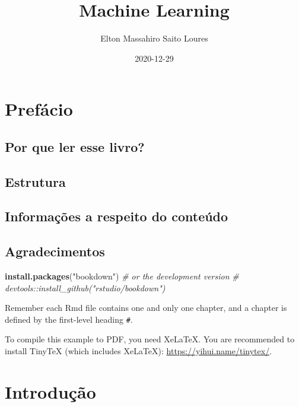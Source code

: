 \documentclass[
]{book}
\title{Machine Learning}
\author{Elton Massahiro Saito Loures}
\date{2020-12-29}
\newenvironment{Shaded}{\begin{snugshade}}{\end{snugshade}}
\newcommand{\CommentTok}[1]{\textcolor[rgb]{0.56,0.35,0.01}{\textit{#1}}}
\newcommand{\KeywordTok}[1]{\textcolor[rgb]{0.13,0.29,0.53}{\textbf{#1}}}
\newcommand{\NormalTok}[1]{#1}
\newcommand{\StringTok}[1]{\textcolor[rgb]{0.31,0.60,0.02}{#1}}
\begin{document}
\maketitle

{
\setcounter{tocdepth}{1}
\tableofcontents
}
\hypertarget{prefuxe1cio}{%
\chapter*{Prefácio}\label{prefuxe1cio}}

\hypertarget{por-que-ler-esse-livro}{%
\section{Por que ler esse livro?}\label{por-que-ler-esse-livro}}

\hypertarget{estrutura}{%
\section{Estrutura}\label{estrutura}}

\hypertarget{informauxe7uxf5es-a-respeito-do-conteuxfado}{%
\section{Informações a respeito do conteúdo}\label{informauxe7uxf5es-a-respeito-do-conteuxfado}}

\hypertarget{agradecimentos}{%
\section{Agradecimentos}\label{agradecimentos}}

\begin{Shaded}
\begin{Highlighting}[]
\KeywordTok{install.packages}\NormalTok{(}\StringTok{"bookdown"}\NormalTok{)}
\CommentTok{# or the development version}
\CommentTok{# devtools::install_github("rstudio/bookdown")}
\end{Highlighting}
\end{Shaded}

Remember each Rmd file contains one and only one chapter, and a chapter is defined by the first-level heading \texttt{\#}.

To compile this example to PDF, you need XeLaTeX. You are recommended to install TinyTeX (which includes XeLaTeX): \url{https://yihui.name/tinytex/}.

\hypertarget{intro}{%
\chapter{Introdução}\label{intro}}
\end{document}
